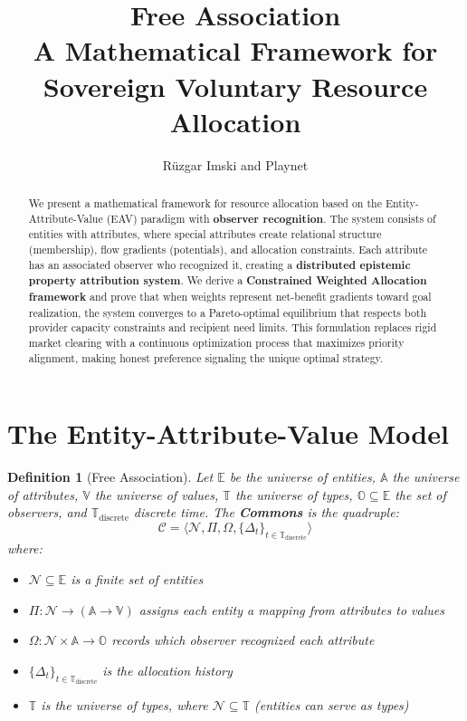 \documentclass[11pt]{article}
\title{\textbf{Free Association}\\
\large A Mathematical Framework for Sovereign Voluntary Resource Allocation}
\author{Rüzgar Imski and Playnet}
\date{}
\newtheorem{definition}{Definition}
\begin{document}
\maketitle

\begin{abstract}
We present a mathematical framework for resource allocation based on the Entity-Attribute-Value (EAV) paradigm with \textbf{observer recognition}. The system consists of entities with attributes, where special attributes create relational structure (membership), flow gradients (potentials), and allocation constraints. Each attribute has an associated observer who recognized it, creating a \textbf{distributed epistemic property attribution system}. We derive a \textbf{Constrained Weighted Allocation framework} and prove that when weights represent net-benefit gradients toward goal realization, the system converges to a Pareto-optimal equilibrium that respects both provider capacity constraints and recipient need limits. This formulation replaces rigid market clearing with a continuous optimization process that maximizes priority alignment, making honest preference signaling the unique optimal strategy.
\end{abstract}

\section{The Entity-Attribute-Value Model}

\begin{definition}[Free Association]
Let $\mathbb{E}$ be the universe of entities, $\mathbb{A}$ the universe of attributes, $\mathbb{V}$ the universe of values, $\mathbb{T}$ the universe of types, $\mathbb{O} \subseteq \mathbb{E}$ the set of observers, and $\mathbb{T}_{\text{discrete}}$ discrete time. The \textbf{Commons} is the quadruple:
\[
\mathcal{C} = \langle \mathcal{N}, \Pi, \Omega, \{\Delta_t\}_{t \in \mathbb{T}_{\text{discrete}}} \rangle
\]
where:
\begin{itemize}
\item $\mathcal{N} \subseteq \mathbb{E}$ is a finite set of entities
\item $\Pi: \mathcal{N} \to (\mathbb{A} \to \mathbb{V})$ assigns each entity a mapping from attributes to values
\item $\Omega: \mathcal{N} \times \mathbb{A} \to \mathbb{O}$ records which observer recognized each attribute
\item $\{\Delta_t\}_{t \in \mathbb{T}_{\text{discrete}}}$ is the allocation history
\item $\mathbb{T}$ is the universe of types, where $\mathcal{N} \subseteq \mathbb{T}$ (entities can serve as types)
\end{itemize}
\end{definition}
\end{document}

